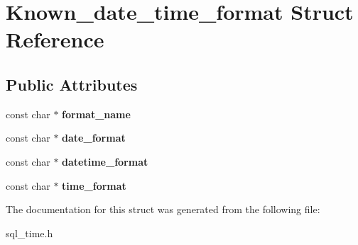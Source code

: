 \hypertarget{structKnown__date__time__format}{}\section{Known\+\_\+date\+\_\+time\+\_\+format Struct Reference}
\label{structKnown__date__time__format}
\subsection*{Public Attributes}
\begin{DoxyCompactItemize}
\item 
\mbox{\label{structKnown__date__time__format_ac286a241591d100bff2c3899498c90bc}} 
const char $\ast$ {\bfseries format\+\_\+name}
\item 
\mbox{\label{structKnown__date__time__format_aaa7522db8f48ec75f4b764099fa38913}} 
const char $\ast$ {\bfseries date\+\_\+format}
\item 
\mbox{\label{structKnown__date__time__format_aa4f063331a0d76bdcdfba861ec6271fe}} 
const char $\ast$ {\bfseries datetime\+\_\+format}
\item 
\mbox{\label{structKnown__date__time__format_a344d5196c926de1d51454820d3871c9f}} 
const char $\ast$ {\bfseries time\+\_\+format}
\end{DoxyCompactItemize}


The documentation for this struct was generated from the following file\+:\begin{DoxyCompactItemize}
\item 
sql\+\_\+time.\+h\end{DoxyCompactItemize}
